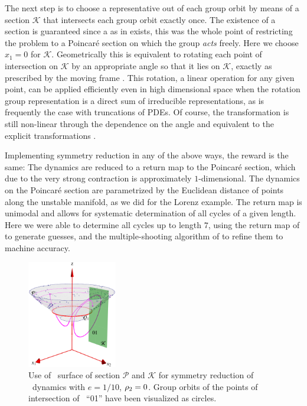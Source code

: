 The next step is to choose a representative out of each group orbit by means of a section $\mathcal{K}$ that intersects each group orbit
exactly once. The existence of a section is guaranteed since a {\csection} as in  exists,
this was the whole point of restricting the problem to a Poincar\'e section
on which the group \emph{acts} freely. Here we choose $x_1=0$ for $\mathcal{K}$. Geometrically
this is equivalent to rotating each point of intersection on $\mathcal{K}$ by
an appropriate angle so that it lies on $\mathcal{K}$, exactly as prescribed by
the moving frame . This rotation, a linear operation for any given point,
can be applied efficiently even in high dimensional space when the rotation group representation is a direct
sum of irreducible representations, as is frequently the case with truncations of PDEs.
Of course, the transformation is still non-linear through the dependence on the angle and equivalent
to the explicit transformations .

Implementing symmetry reduction in any of the above ways, the reward is the same: The
dynamics are reduced to a return map to the Poincar\'e section, which due to
the very strong contraction is approximately $1$-dimensional. The dynamics on the Poincar\'e
section are parametrized by the Euclidean distance of points along the unstable manifold, as we did
for the Lorenz example.
The return map is unimodal and allows for systematic determination of all cycles of
a given length. Here we were able to determine all cycles up to length $7$, using
the return map of  to generate guesses, and the multiple-shooting
algorithm of  to refine them to machine accuracy.

\begin{figure}[ht]
\begin{center}
  \includegraphics[width=0.35\textwidth]{../figs/CLEmartini}
\end{center}
\caption[\CLe\ desymmetrization with double section]{Use of \Poincare\
surface of section $\mathcal{P}$ and {\csection} $\mathcal{K}$ for symmetry
reduction of \CLe\ dynamics with $e=1/10$, $\rho_2=0$.
Group orbits of the points of intersection of \rpo\ ``01'' have been visualized as circles.
    }
\label{fig:CLEmartini}
\end{figure}


